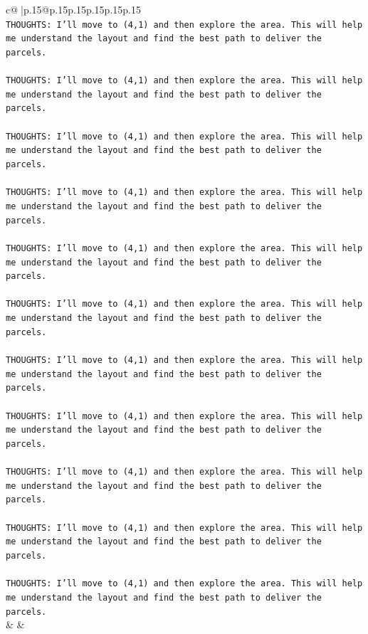 \documentclass{article}
\begin{document}
{\begin{supertabular}{c@{$\;$}|p{.15\linewidth}@{}p{.15\linewidth}p{.15\linewidth}p{.15\linewidth}p{.15\linewidth}p{.15\linewidth}}
{{{\\ 
\texttt{THOUGHTS: I'll move to (4,1) and then explore the area. This will help me understand the layout and find the best path to deliver the parcels.} \\
\\ 
\texttt{THOUGHTS: I'll move to (4,1) and then explore the area. This will help me understand the layout and find the best path to deliver the parcels.} \\
\\ 
\texttt{THOUGHTS: I'll move to (4,1) and then explore the area. This will help me understand the layout and find the best path to deliver the parcels.} \\
\\ 
\texttt{THOUGHTS: I'll move to (4,1) and then explore the area. This will help me understand the layout and find the best path to deliver the parcels.} \\
\\ 
\texttt{THOUGHTS: I'll move to (4,1) and then explore the area. This will help me understand the layout and find the best path to deliver the parcels.} \\
\\ 
\texttt{THOUGHTS: I'll move to (4,1) and then explore the area. This will help me understand the layout and find the best path to deliver the parcels.} \\
\\ 
\texttt{THOUGHTS: I'll move to (4,1) and then explore the area. This will help me understand the layout and find the best path to deliver the parcels.} \\
\\ 
\texttt{THOUGHTS: I'll move to (4,1) and then explore the area. This will help me understand the layout and find the best path to deliver the parcels.} \\
\\ 
\texttt{THOUGHTS: I'll move to (4,1) and then explore the area. This will help me understand the layout and find the best path to deliver the parcels.} \\
\\ 
\texttt{THOUGHTS: I'll move to (4,1) and then explore the area. This will help me understand the layout and find the best path to deliver the parcels.} \\
\\ 
\texttt{THOUGHTS: I'll move to (4,1) and then explore the area. This will help me understand the layout and find the best path to deliver the parcels.} \\
            }
        }
    }
    & & \\ \\


\end{supertabular}}
\end{document}
